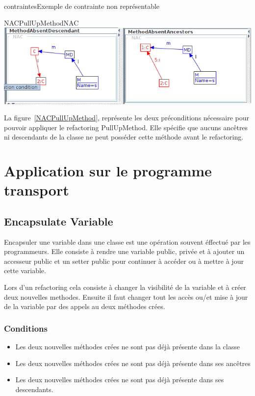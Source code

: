 \documentclass[a4paper, 12pt]{article}
\begin{document}
\begin{figu}{contraintes}{Exemple de contrainte non représentable}
  \begin{myfig}{NACPullUpMethod}{NAC}
    \includegraphics[width=\textwidth]{NACPullUpMethod.png}
  \end{myfig}

  La figure~\ref{NACPullUpMethod}, représente les deux préconditions nécessaire pour pouvoir appliquer le refactoring PullUpMethod.
  Elle spécifie que aucuns ancêtres ni descendants de la classe ne peut posséder cette méthode avant le refactoring.


  \section{Application sur le programme transport}

  \subsection{Encapsulate Variable}

  Encapsuler une variable dans une classe est une opération souvent éffectué par les programmeurs.
  Elle consiste à rendre une variable public, privée et à ajouter un accesseur public et un setter public pour continuer à accéder ou à mettre à jour cette variable.

  Lors d'un refactoring cela consiste à changer la visibilité de la variable et à créer deux nouvelles methodes. Ensuite il faut changer tout les accès ou/et mise à jour de la variable par des appels au deux méthodes crées.

  \subsubsection{Conditions}

  \begin{itemize}[label=\textbullet]
    \item Les deux nouvelles méthodes crées ne sont pas déjà présente dans la classe
    \item Les deux nouvelles méthodes crées ne sont pas déjà présente dans ses ancêtres
    \item Les deux nouvelles méthodes crées ne sont pas déjà présente dans ses descendants.
  \end{itemize}


\end{figu}
\end{document}

